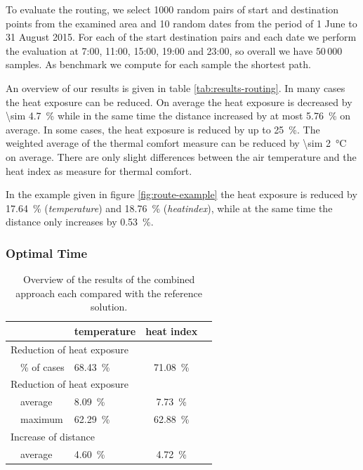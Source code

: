 To evaluate the routing, we select 1000 random pairs of start and destination points from the examined  area and 10 random dates from the period of 1 June to 31 August 2015. For each of the start destination pairs and each date we  perform the evaluation at 7:00, 11:00, 15:00, 19:00 and 23:00, so overall we have $50\,000$ samples. As benchmark we compute for each sample the shortest path. 


An overview of our results is given in table \ref{tab:results-routing}. In many cases the heat exposure can be reduced. On average the heat exposure is decreased by \SI{\sim 4.7}{\percent} while in the same time the distance increased by at most \SI{5.76}{\percent} on average. In some cases, the heat exposure is reduced by up to \SI{25}{\percent}. The weighted average of the thermal comfort measure can be reduced by \SI{\sim 2}{\celsius} on average. There are only slight differences between the air temperature and the heat index as measure for thermal comfort. 

In the example given in figure \ref{fig:route-example} the heat exposure is reduced by \SI{17.64}{\percent} (\emph{temperature}) and \SI{18.76}{\percent} (\emph{heatindex}), while at the same time the distance only increases by  \SI{0.53}{\percent}.

\subsubsection{Optimal Time}

\begin{table}
	\centering
	\begin{tabular}{lp{9.25cm}lcc}
		\toprule
		& & temperature & heat index \\
		\midrule
		\multicolumn{4}{l}{Reduction of heat exposure}   \\
		& \% of cases  & \SI{68.43}{\percent} & \SI{71.08}{\percent}  \\
		\multicolumn{4}{l}{Reduction of heat exposure}  \\
		& average  & \SI{8.09}{\percent} & \SI{7.73}{\percent}  \\
		& maximum  & \SI{62.29}{\percent} & \SI{62.88}{\percent}  \\
		\multicolumn{4}{l}{Increase of distance}  \\
		& average  & \SI{4.60}{\percent}  & \SI{4.72}{\percent}  \\
		\bottomrule
	\end{tabular}
	\caption{Overview of the results of the combined approach each compared with the reference solution.  \label{tab:results-optimal-time}}
\end{table}

